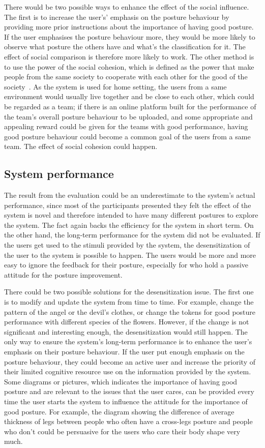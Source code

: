 There would be two possible ways to enhance the effect of the social influence. The first is to increase the user's’ emphasis on the posture behaviour by providing more prior instructions about the importance of having good posture. If the user emphasises the posture behaviour more, they would be more likely to observe what posture the others have and what’s the classification for it. The effect of social comparison is therefore more likely to work. The other method is to use the power of the social cohesion, which is defined as the power that make people from the same society to cooperate with each other for the good of the society~\cite{elaboration_modeL_persuasion}. As the system is used for home setting, the users from a same environment would usually live together and be close to each other, which could be regarded as a team; if there is an online platform built for the performance of the team’s overall posture behaviour to be uploaded, and some appropriate and appealing reward could be given for the teams with good performance, having good posture behaviour could become a common goal of the users from a same team. The effect of social cohesion could happen.

\subsection{System performance}
The result from the evaluation could be an underestimate to the system's actual performance, since most of the participants presented they felt the effect of the system is novel and therefore intended to have many different postures to explore the system. The fact again backs the efficiency for the system in short term. On the other hand, the long-term performance for the system did not be evaluated. If the users get used to the stimuli provided by the system, the desensitization of the user to the system is possible to happen. The users would be more and more easy to ignore the feedback for their posture, especially for who hold a passive attitude for the posture improvement.

There could be two possible solutions for the desensitization issue. The first one is to modify and update the system from time to time. For example, change the pattern of the angel or the devil’s clothes, or change the tokens for good posture performance with different species of the flowers. However, if the change is not significant and interesting enough, the desensitization would still happen. The only way to ensure the system's long-term performance is to enhance the user’s emphasis on their posture behaviour. If the user put enough emphasis on the posture behaviour, they could become an active user and increase the priority of their limited cognitive resource use on the information provided by the system. Some diagrams or pictures, which indicates the importance of having good posture and are relevant to the issues that the user cares, can be provided every time the user starts the system to influence the attitude for the importance of good posture. For example, the diagram showing the difference of average thickness of legs between people who often have a cross-legs posture and people who don’t could be persuasive for the users who care their body shape very much.

